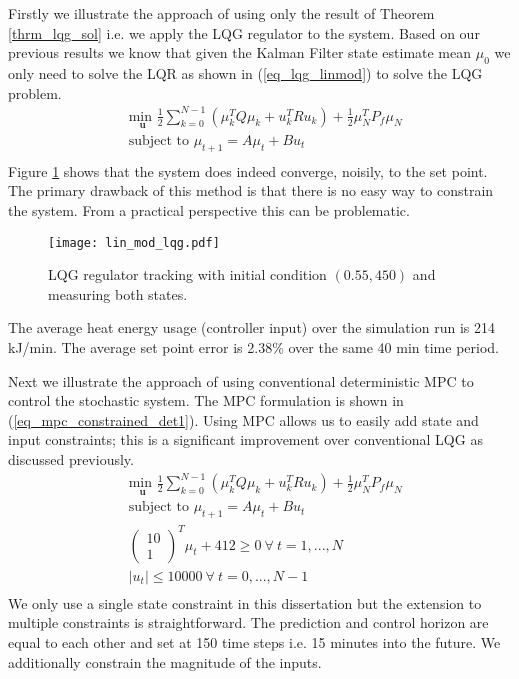 Firstly we illustrate the approach of using only the result of Theorem \ref{thrm_lqg_sol} i.e. we apply the LQG regulator to the system. Based on our previous results we know that given the Kalman Filter state estimate mean $\mu_0$ we only need to solve the LQR as shown in (\ref{eq_lqg_linmod}) to solve the LQG problem. 
\begin{equation}
\begin{aligned}
&\underset{\mathbf{u}}{\text{min }} \frac{1}{2}\sum_{k=0}^{N-1} \left( \mu_k^TQ\mu_k + u_k^TRu_k \right) + \frac{1}{2}\mu_N^TP_f\mu_N \\
& \text{subject to } \mu_{t+1}=A\mu_t + Bu_t \\
\end{aligned}
\label{eq_lqg_linmod}
\end{equation}
Figure \ref{fig_lin_mod_lqg} shows that the system does indeed converge, noisily, to the set point. The primary drawback of this method is that there is no easy way to constrain the system. From a practical perspective this can be problematic. 
\begin{figure}[H] 
\centering
\texttt{[image: lin\_mod\_lqg.pdf]}
\caption{LQG regulator tracking with initial condition $(0.55, 450)$ and measuring both states.}
\label{fig_lin_mod_lqg}
\end{figure}
The average heat energy usage (controller input) over the simulation run is 214 kJ/min. The average set point error is 2.38\% over the same 40 min time period.
 
Next we illustrate the approach of using conventional deterministic MPC to control the stochastic system. The MPC formulation is shown in (\ref{eq_mpc_constrained_det1}). Using MPC allows us to easily add state and input constraints; this is a significant improvement over conventional LQG as discussed previously.
\begin{equation}
\begin{aligned}
&\underset{\mathbf{u}}{\text{min }} \frac{1}{2}\sum_{k=0}^{N-1} \left( \mu_k^TQ\mu_k + u_k^TRu_k \right) + \frac{1}{2}\mu_N^TP_f\mu_N \\
& \text{subject to } \mu_{t+1}=A\mu_t + Bu_t \\
& \begin{pmatrix}
10 \\ 1
\end{pmatrix}^T \mu_t + 412 \geq 0 ~\forall ~t=1,...,N\\
&  |u_t| \leq 10000 ~\forall ~t=0,...,N-1\\
\end{aligned}
\label{eq_mpc_constrained_det1}
\end{equation}
We only use a single state constraint in this dissertation but the extension to multiple constraints is straightforward. The prediction and control horizon are equal to each other and set at 150 time steps i.e. 15 minutes into the future. We additionally constrain the magnitude of the inputs.

